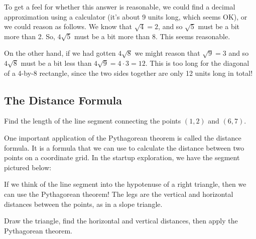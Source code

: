 To get a feel for whether this answer is reasonable, we could find a decimal approximation using a calculator (it's about 9 units long, which seems OK), or we could reason as follows. We know that $\sqrt{4} = 2$, and so $\sqrt{5}$ must be a bit more than 2. So, $4\sqrt{5}$ must be a bit more than 8. This seems reasonable.

On the other hand, if we had gotten $4\sqrt{8}$ we might reason that $\sqrt{9} = 3$ and so $4\sqrt{8}$ must be a bit less than $4\sqrt{9} = 4\cdot3 = 12$. This is too long for the diagonal of a 4-by-8 rectangle, since the two sides together are only 12 units long in total!

\subsection{The Distance Formula}

\begin{boxedexplore}
Find the length of the line segment connecting the points $(1,2)$ and $(6,7)$.
\end{boxedexplore}

One important application of the Pythagorean theorem is called the \gls{distance formula}. It is a formula that we can use to calculate the distance between two points on a coordinate grid. In the startup exploration, we have the segment pictured below:

\begin{center}
\end{center}

If we think of the line segment into the hypotenuse of a right triangle, then we can use the Pythagorean theorem! The legs are the vertical and horizontal distances between the points, as in a slope triangle.

Draw the triangle, find the horizontal and vertical distances, then apply the Pythagorean theorem.

